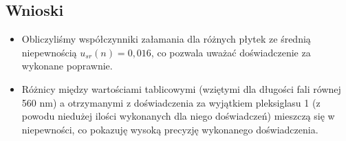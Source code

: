 \documentclass[]{article}
\begin{document}
\subsection{Wnioski}
\begin{itemize}
		\item Obliczyliśmy współczynniki załamania dla różnych płytek ze średnią niepewnością \(u_{sr}(n) = 0,016\), co pozwala uważać doświadczenie za wykonane poprawnie.
		\item  Różnicy między wartościami tablicowymi (wziętymi dla długości fali równej 560 nm) a otrzymanymi z doświadczenia za wyjątkiem pleksiglasu 1 (z powodu niedużej ilości wykonanych dla niego doświadczeń) mieszczą się w niepewności, co pokazuję wysoką precyzję wykonanego doświadczenia.
	\end{itemize}
\end{document}
